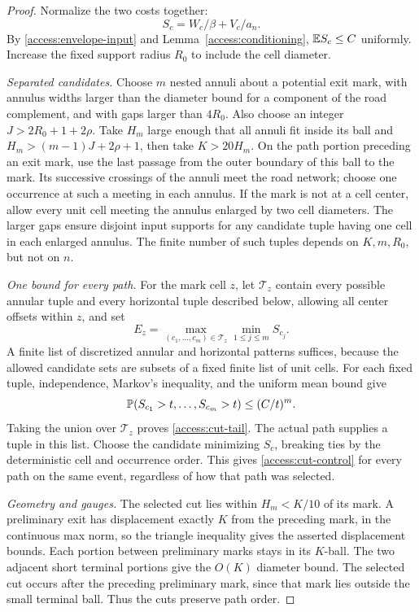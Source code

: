 \begin{proof}
Normalize the two costs together:
\[
                  S_c=W_c/\beta+V_c/a_n.
\]
By \eqref{access:envelope-input} and Lemma~\ref{access:conditioning},
$\mathbb E S_c\le C$ uniformly.  Increase the fixed support radius $R_0$
to include the cell diameter.

\emph{Separated candidates.}
Choose $m$ nested annuli about a potential exit mark, with annulus widths
larger than the diameter bound for a component of the road complement,
and with gaps larger than $4R_0$. Also choose an integer
$J>2R_0+1+2\rho$. Take $H_m$ large enough that all annuli fit inside
its ball and $H_m>(m-1)J+2\rho+1$, then take $K>20H_m$.
On the path portion preceding an
exit mark, use the last passage from the outer boundary of this ball to
the mark.  Its successive crossings of the annuli meet the road network;
choose one occurrence at such a meeting in each annulus.  If the mark is
not at a cell center, allow every unit cell meeting the annulus enlarged
by two cell diameters.  The larger gaps ensure disjoint input supports for
any candidate tuple having one cell in each enlarged annulus.  The finite
number of such tuples depends on $K,m,R_0$, but not on $n$.

\emph{One bound for every path.}
For the mark cell $z$, let $\mathcal T_z$ contain every possible annular
tuple and every horizontal tuple described below, allowing all center
offsets within $z$, and set
\[
                  E_z=\max_{(c_1,\ldots,c_m)\in\mathcal T_z}
                                  \min_{1\le j\le m}S_{c_j}.
\]
A finite list of discretized annular and horizontal patterns suffices, because the
allowed candidate sets are subsets of a fixed finite list of unit cells.
For each fixed tuple, independence, Markov's inequality, and the uniform
mean bound give
\[
 \mathbb P(S_{c_1}>t,\ldots,S_{c_m}>t)\le (C/t)^m.
\]
Taking the union over $\mathcal T_z$ proves \eqref{access:cut-tail}.
The actual path supplies a tuple in this list.  Choose the candidate
minimizing $S_c$, breaking ties by the deterministic cell and occurrence
order.  This gives \eqref{access:cut-control} for every path on the same
event, regardless of how that path was selected.

\emph{Geometry and gauges.}
The selected cut lies within $H_m<K/10$ of its mark.  A preliminary exit
has displacement exactly $K$ from the preceding mark, in the continuous
max norm, so the triangle inequality gives the asserted displacement
bounds.  Each portion between preliminary marks stays in its $K$-ball.
The two adjacent short terminal portions give the $O(K)$ diameter bound.
The selected cut occurs after the preceding preliminary mark, since
that mark lies outside the small terminal ball.  Thus the cuts preserve
path order.


\end{proof}
